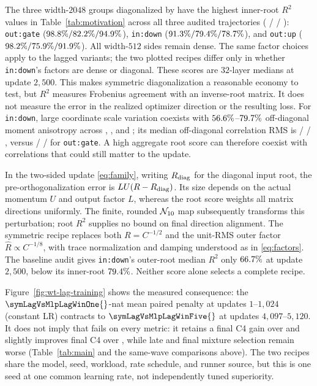 The three width-$2048$ groups diagonalized by  have the highest
inner-root $R^2$ values in Table~\ref{tab:motivation} across all three audited
trajectories ( /  / ):
\texttt{out:gate} ($98.8\% / 82.2\%
/ 94.9\%$), \texttt{in:down}
($91.3\% / 79.4\% /
78.7\%$), and \texttt{out:up}
($98.2\% / 75.9\% /
91.9\%$). All width-$512$ sides remain dense.
The same factor choices apply to the lagged variants; the two plotted recipes
differ only in whether \texttt{in:down}'s factors are dense or diagonal.
These scores are $32$-layer medians at update $2{,}500$.
This makes symmetric diagonalization a reasonable economy to test, but
$R^2$ measures Frobenius agreement with an inverse-root matrix. It does not
measure the error in the realized optimizer direction or the resulting loss.
For \texttt{in:down}, large coordinate scale variation coexists with
$56.6\%$--$79.7\%$
off-diagonal moment anisotropy across , , and
; its median off-diagonal correlation RMS is
\motMuonInDownCorrRmsMed{} / \motInDownCorrRmsMed{} / \motWtInDownCorrRmsMed{},
versus \motMuonOutGateCorrRmsMed{} / \motOutGateCorrRmsMed{} /
\motWtOutGateCorrRmsMed{} for \texttt{out:gate}. A high aggregate root score can
therefore coexist with correlations that could still matter to the update.

In the two-sided update \eqref{eq:family}, writing $R_{\operatorname{diag}}$ for the diagonal
input root, the pre-orthogonalization
error is $L U(R-R_{\operatorname{diag}})$. Its size depends on the actual momentum $U$ and
output factor $L$, whereas the root score weights all matrix directions
uniformly. The finite, rounded $\mathcal{N}_{10}$ map subsequently transforms this
perturbation; root $R^2$ supplies no bound on final direction alignment.
The symmetric recipe replaces both $R=C^{-1/2}$ and the
unit-RMS outer factor $\hat R\propto C^{-1/8}$, with trace normalization and
damping understood as in \eqref{eq:factors}. The baseline audit gives
\texttt{in:down}'s outer-root median $R^2$ only
$66.7\%$ at update $2{,}500$, below its inner-root
$79.4\%$. Neither score alone selects a complete recipe.

Figure~\ref{fig:wt-lag-training} shows the measured consequence: the
$\symLagVsMlpLagWinOne{}$-nat mean paired penalty at updates $1$--$1{,}024$
(constant LR) contracts to $\symLagVsMlpLagWinFive{}$ at updates
$4{,}097$--$5{,}120$. It does not imply
that  fails on every metric: it retains a final C4 gain
over  and slightly improves final C4 over ,
while late and final mixture selection remain worse
(Table~\ref{tab:main} and the same-wave comparisons above). The two recipes share
the model, seed, workload, rate schedule, and runner source, but this is one
seed at one common learning rate, not independently tuned superiority.


